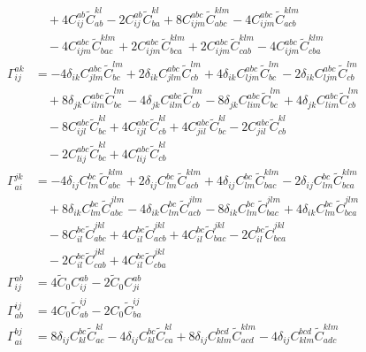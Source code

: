 \begin{align}
&\quad {}+ 4 C^{ab}_{ij} \widetilde{C}^{kl}_{ab} - 2 C^{ab}_{ij} \widetilde{C}^{kl}_{ba} + 8 C^{abc}_{ijm} \widetilde{C}^{klm}_{abc} - 4 C^{abc}_{ijm} \widetilde{C}^{klm}_{acb} \\
&\quad -4 C^{abc}_{ijm} \widetilde{C}^{klm}_{bac} + 2 C^{abc}_{ijm} \widetilde{C}^{klm}_{bca} + 2 C^{abc}_{ijm} \widetilde{C}^{klm}_{cab} - 4 C^{abc}_{ijm} \widetilde{C}^{klm}_{cba} \\
\Gamma^{ak}_{ij} &= -4 \delta_{ik} C^{abc}_{jlm} \widetilde{C}^{lm}_{bc} + 2 \delta_{ik} C^{abc}_{jlm} \widetilde{C}^{lm}_{cb} + 4 \delta_{ik} C^{abc}_{ljm} \widetilde{C}^{lm}_{bc} - 2 \delta_{ik} C^{abc}_{ljm} \widetilde{C}^{lm}_{cb} \\
&\quad {}+ 8 \delta_{jk} C^{abc}_{ilm} \widetilde{C}^{lm}_{bc} - 4 \delta_{jk} C^{abc}_{ilm} \widetilde{C}^{lm}_{cb} - 8 \delta_{jk} C^{abc}_{lim} \widetilde{C}^{lm}_{bc} + 4 \delta_{jk} C^{abc}_{lim} \widetilde{C}^{lm}_{cb} \\
&\quad -8 C^{abc}_{ijl} \widetilde{C}^{kl}_{bc} + 4 C^{abc}_{ijl} \widetilde{C}^{kl}_{cb} + 4 C^{abc}_{jil} \widetilde{C}^{kl}_{bc} - 2 C^{abc}_{jil} \widetilde{C}^{kl}_{cb} \\
&\quad -2 C^{abc}_{lij} \widetilde{C}^{kl}_{bc} + 4 C^{abc}_{lij} \widetilde{C}^{kl}_{cb} \\
\Gamma^{jk}_{ai} &= -4 \delta_{ij} C^{bc}_{lm} \widetilde{C}^{klm}_{abc} + 2 \delta_{ij} C^{bc}_{lm} \widetilde{C}^{klm}_{acb} + 4 \delta_{ij} C^{bc}_{lm} \widetilde{C}^{klm}_{bac} - 2 \delta_{ij} C^{bc}_{lm} \widetilde{C}^{klm}_{bca} \\
&\quad {}+ 8 \delta_{ik} C^{bc}_{lm} \widetilde{C}^{jlm}_{abc} - 4 \delta_{ik} C^{bc}_{lm} \widetilde{C}^{jlm}_{acb} - 8 \delta_{ik} C^{bc}_{lm} \widetilde{C}^{jlm}_{bac} + 4 \delta_{ik} C^{bc}_{lm} \widetilde{C}^{jlm}_{bca} \\
&\quad -8 C^{bc}_{il} \widetilde{C}^{jkl}_{abc} + 4 C^{bc}_{il} \widetilde{C}^{jkl}_{acb} + 4 C^{bc}_{il} \widetilde{C}^{jkl}_{bac} - 2 C^{bc}_{il} \widetilde{C}^{jkl}_{bca} \\
&\quad -2 C^{bc}_{il} \widetilde{C}^{jkl}_{cab} + 4 C^{bc}_{il} \widetilde{C}^{jkl}_{cba} \\
\Gamma^{ab}_{ij} &= 4 \widetilde{C}_{0} C^{ab}_{ij} - 2 \widetilde{C}_{0} C^{ab}_{ji} \\
\Gamma^{ij}_{ab} &= 4 C_{0} \widetilde{C}^{ij}_{ab} - 2 C_{0} \widetilde{C}^{ij}_{ba} \\
\Gamma^{bj}_{ai} &= 8 \delta_{ij} C^{bc}_{kl} \widetilde{C}^{kl}_{ac} - 4 \delta_{ij} C^{bc}_{kl} \widetilde{C}^{kl}_{ca} + 8 \delta_{ij} C^{bcd}_{klm} \widetilde{C}^{klm}_{acd} - 4 \delta_{ij} C^{bcd}_{klm} \widetilde{C}^{klm}_{adc} \\

\end{align}
